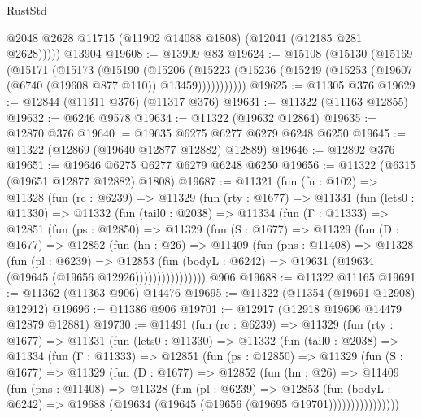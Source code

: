 \begin{lexlean}{RustStd}
\begin{coremodule}
          @2048
          @2628
          @11715
          (@11902 @14088 @1808)
          (@12041 (@12185 @281 @2628)))))
    @13904
@19608 := @13909 @83
@19624 := @15108
    (@15130
      (@15169
        (@15171
          (@15173
            (@15190
              (@15206
                (@15223 (@15236 (@15249 (@15253 (@19607 (@6740 (@19608 @877 @110)) @13459)))))))))))
@19625 := @11305 @376
@19629 := @12844 (@11311 @376) (@11317 @376)
@19631 := @11322 (@11163 @12855)
@19632 := @6246 @9578
@19634 := @11322 (@19632 @12864)
@19635 := @12870 @376
@19640 := @19635 @6275 @6277 @6279 @6248 @6250
@19645 := @11322 (@12869 (@19640 @12877 @12882) @12889)
@19646 := @12892 @376
@19651 := @19646 @6275 @6277 @6279 @6248 @6250
@19656 := @11322 (@6315 (@19651 @12877 @12882) @1808)
@19687 := @11321
    (fun (fn : @102) =>
    @11328
      (fun (rc : @6239) =>
      @11329
        (fun (rty : @1677) =>
        @11331
          (fun (lets0 : @11330) =>
          @11332
            (fun (tail0 : @2038) =>
            @11334
              (fun (Γ : @11333) =>
              @12851
                (fun (ps : @12850) =>
                @11329
                  (fun (S : @1677) =>
                  @11329
                    (fun (D : @1677) =>
                    @12852
                      (fun (hn : @26) =>
                      @11409
                        (fun (pns : @11408) =>
                        @11328
                          (fun (pl : @6239) =>
                          @12853
                            (fun (bodyL : @6242) =>
                            @19631 (@19634 (@19645 (@19656 @12926))))))))))))))))
    @906
@19688 := @11322 @11165
@19691 := @11362 (@11363 @906) @14476
@19695 := @11322 (@11354 (@19691 @12908) @12912)
@19696 := @11386 @906
@19701 := @12917 (@12918 @19696 @14479 @12879 @12881)
@19730 := @11491
    (fun (rc : @6239) =>
    @11329
      (fun (rty : @1677) =>
      @11331
        (fun (lets0 : @11330) =>
        @11332
          (fun (tail0 : @2038) =>
          @11334
            (fun (Γ : @11333) =>
            @12851
              (fun (ps : @12850) =>
              @11329
                (fun (S : @1677) =>
                @11329
                  (fun (D : @1677) =>
                  @12852
                    (fun (hn : @26) =>
                    @11409
                      (fun (pns : @11408) =>
                      @11328
                        (fun (pl : @6239) =>
                        @12853
                          (fun (bodyL : @6242) =>
                          @19688 (@19634 (@19645 (@19656 (@19695 @19701))))))))))))))))

\end{coremodule}
\end{lexlean}
